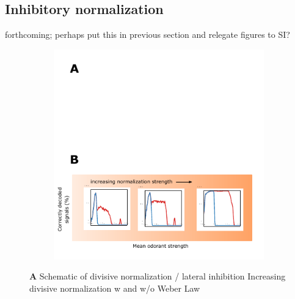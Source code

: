 


\subsection{Inhibitory normalization}



{\color{blue} forthcoming; perhaps put this in previous section and relegate figures to SI?}





\begin{figure}
	\begin{subfigure}[t]{\linewidth}
		\includegraphics[width=\textwidth]{figures/Figures_signal_decoding_weber_law_2}
		\label{fig:divisive_normalization_a}
	\end{subfigure}
	\begin{subfigure}[t]{\linewidth}
		\label{fig:divisive_normalization_b}
	\end{subfigure}
	\caption{\textbf{A} Schematic of divisive normalization / lateral inhibition  Increasing divisive normalization w and w/o Weber Law}
	\label{fig:divisive_normalization}
\end{figure}



